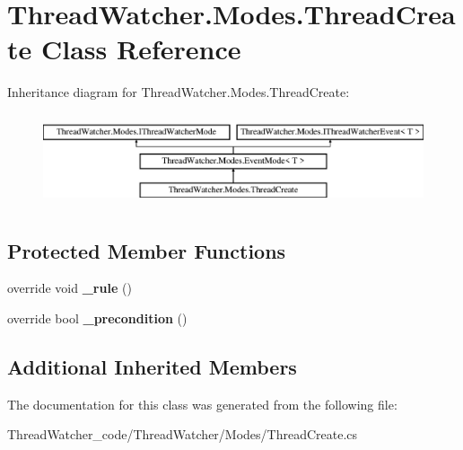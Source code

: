 \hypertarget{class_thread_watcher_1_1_modes_1_1_thread_create}{\section{Thread\+Watcher.\+Modes.\+Thread\+Create Class Reference}
\label{class_thread_watcher_1_1_modes_1_1_thread_create}
}
Inheritance diagram for Thread\+Watcher.\+Modes.\+Thread\+Create\+:\begin{figure}[H]
\begin{center}
\leavevmode
\includegraphics[height=2.745098cm]{class_thread_watcher_1_1_modes_1_1_thread_create}
\end{center}
\end{figure}
\subsection*{Protected Member Functions}
\begin{DoxyCompactItemize}
\item 
\hypertarget{class_thread_watcher_1_1_modes_1_1_thread_create_ac3fdc97896ea4b051f1a80321cbe73fe}{override void {\bfseries \+\_\+rule} ()}\label{class_thread_watcher_1_1_modes_1_1_thread_create_ac3fdc97896ea4b051f1a80321cbe73fe}

\item 
\hypertarget{class_thread_watcher_1_1_modes_1_1_thread_create_a99f0ffb8bf63eedfad742ed4cf4aecce}{override bool {\bfseries \+\_\+precondition} ()}\label{class_thread_watcher_1_1_modes_1_1_thread_create_a99f0ffb8bf63eedfad742ed4cf4aecce}

\end{DoxyCompactItemize}
\subsection*{Additional Inherited Members}


The documentation for this class was generated from the following file\+:\begin{DoxyCompactItemize}
\item 
Thread\+Watcher\+\_\+code/\+Thread\+Watcher/\+Modes/Thread\+Create.\+cs\end{DoxyCompactItemize}
